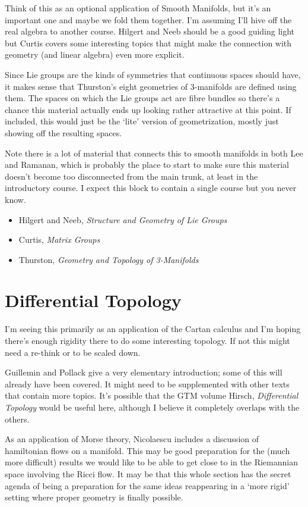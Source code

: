 \documentclass[article]{article}
\begin{document}
Think of this as an optional application of Smooth Manifolds, but it's an important one and maybe we fold them together. I'm assuming I'll hive off the real algebra to another course. Hilgert and Neeb should be a good guiding light but Curtis covers some interesting topics that might make the connection with geometry (and linear algebra) even more explicit. 

Since Lie groups are the kinds of symmetries that continuous spaces should have, it makes sense that Thurston's eight geometries of 3-manifolds are defined using them. The spaces on which the Lie groups act are fibre bundles so there's a chance this material actually ends up looking rather attractive at this point. If included, this would just be the `lite' version of geometrization, mostly just showing off the resulting spaces.

Note there is a lot of material that connects this to smooth manifolds in both Lee and Ramanan, which is probably the place to start to make sure this material doesn't become too disconnected from the main trunk, at least in the introductory course. I expect this block to contain a single course but you never know.

\begin{itemize}
	\item[]{Hilgert and Neeb, \textit{Structure and Geometry of Lie Groups}}
	\item[]{Curtis, \textit{Matrix Groups}}
	\item[]{Thurston, \textit{Geometry and Topology of 3-Manifolds}}
\end{itemize}

\section{Differential Topology}

I'm seeing this primarily as an application of the Cartan calculus and I'm hoping there's enough rigidity there to do some interesting topology. If not this might need a re-think or to be scaled down.

Guillemin and Pollack give a very elementary introduction; some of this will already have been covered. It might need to be supplemented with other texts that contain more topics. It's possible that the GTM volume Hirsch, \textit{Differential Topology} would be useful here, although I believe it completely overlaps with the others.

As an application of Morse theory, Nicolaescu includes a discussion of hamiltonian flows on a manifold. This may be good preparation for the (much more difficult) results we would like to be able to get close to in the Riemannian space involving the Ricci flow. It may be that this whole section has the secret agenda of being a preparation for the same ideas reappearing in a `more rigid' setting where proper geometry is finally possible.
\end{document}

